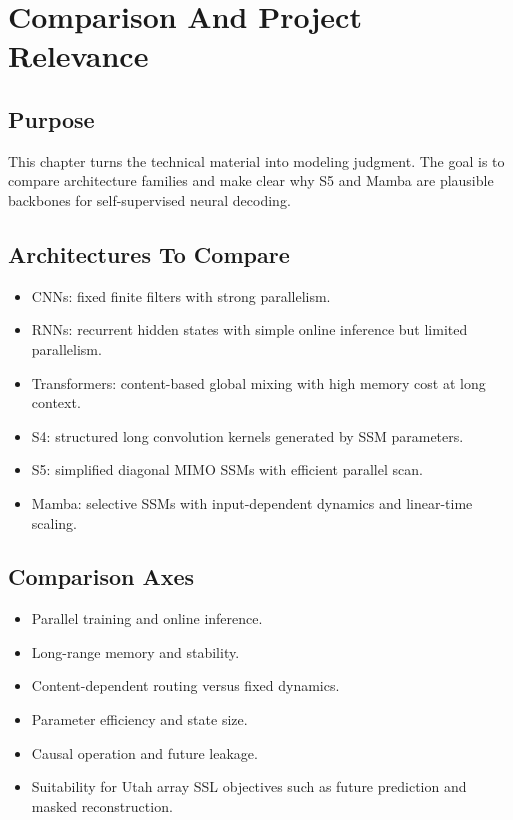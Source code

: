 \chapter{Comparison And Project Relevance}
\label{ch:comparison-and-project-relevance}

\section*{Purpose}

This chapter turns the technical material into modeling judgment. The goal is to compare
architecture families and make clear why S5 and Mamba are plausible backbones for
self-supervised neural decoding.

\section*{Architectures To Compare}

\begin{itemize}
  \item CNNs: fixed finite filters with strong parallelism.
  \item RNNs: recurrent hidden states with simple online inference but limited parallelism.
  \item Transformers: content-based global mixing with high memory cost at long context.
  \item S4: structured long convolution kernels generated by SSM parameters.
  \item S5: simplified diagonal MIMO SSMs with efficient parallel scan.
  \item Mamba: selective SSMs with input-dependent dynamics and linear-time scaling.
\end{itemize}

\section*{Comparison Axes}

\begin{itemize}
  \item Parallel training and online inference.
  \item Long-range memory and stability.
  \item Content-dependent routing versus fixed dynamics.
  \item Parameter efficiency and state size.
  \item Causal operation and future leakage.
  \item Suitability for Utah array SSL objectives such as future prediction and masked reconstruction.
\end{itemize}

